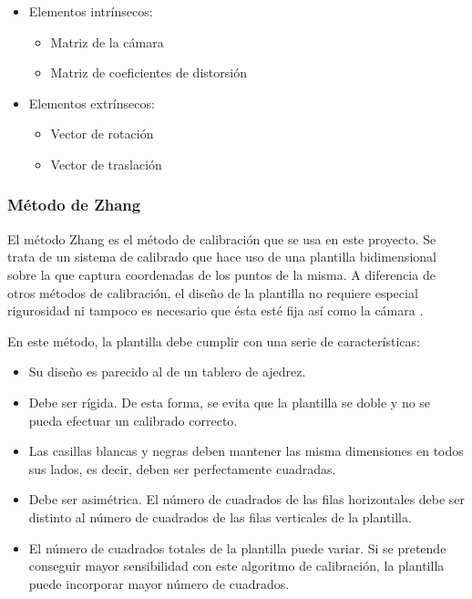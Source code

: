 \begin{itemize}
    \item Elementos intrínsecos:
    \begin{itemize}
        \item Matriz de la cámara
        \item Matriz de coeficientes de distorsión
    \end{itemize}
    \item Elementos extrínsecos:
    \begin{itemize}
        \item Vector de rotación
        \item Vector de traslación
    \end{itemize}
\end{itemize}

\subsubsection{Método de Zhang}\label{s2_2_3_1}

El método Zhang es el método de calibración que se usa en este proyecto. Se trata de un sistema de calibrado que hace uso de una plantilla bidimensional sobre la que captura coordenadas de los puntos de la misma. A diferencia de otros métodos de calibración, el diseño de la plantilla no requiere especial rigurosidad ni tampoco es necesario que ésta esté fija así como la cámara \citep{viala2008procedimiento}. 

En este método, la plantilla debe cumplir con una serie de características:
\begin{itemize}
    \item Su diseño es parecido al de un tablero de ajedrez. 
    \item Debe ser rígida. De esta forma, se evita que la plantilla se doble y no se pueda efectuar un calibrado correcto.
    \item Las casillas blancas y negras deben mantener las misma dimensiones en todos sus lados, es decir, deben ser perfectamente cuadradas.
    \item Debe ser asimétrica. El número de cuadrados de las filas horizontales debe ser distinto al número de cuadrados de las filas verticales de la plantilla.
    \item El número de cuadrados totales de la plantilla puede variar. Si se pretende conseguir mayor sensibilidad con este algoritmo de calibración, la plantilla puede incorporar mayor número de cuadrados. 
\end{itemize}

